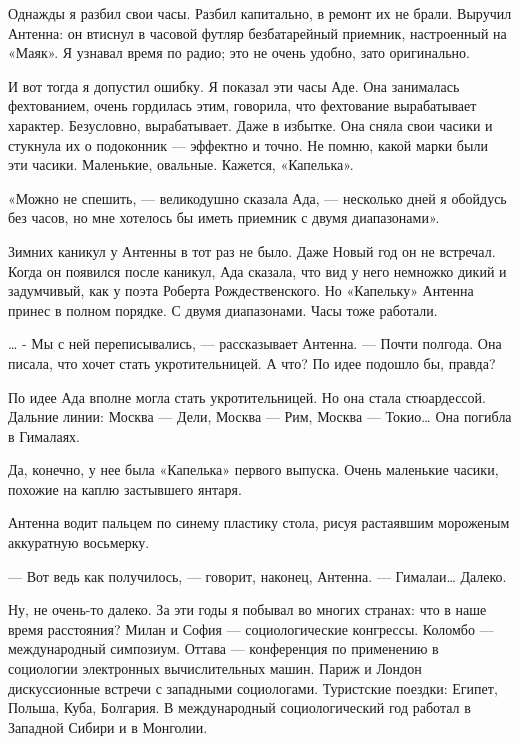    Однажды я  разбил свои  часы. Разбил  капитально, в  ремонт их  не  брали.
   Выручил Антенна:  он  втиснул  в часовой  футляр  безбатарейный  приемник,
   настроенный на «Маяк». Я узнавал время по радио; это не очень удобно, зато
   оригинально.

   И вот тогда  я допустил  ошибку. Я показал  эти часы  Аде. Она  занималась
   фехтованием, очень гордилась этим,  говорила, что фехтование  вырабатывает
   характер. Безусловно, вырабатывает. Даже в избытке. Она сняла свои  часики
   и стукнула их о подоконник — эффектно и точно. Не помню, какой марки  были
   эти часики. Маленькие, овальные. Кажется, «Капелька».

   «Можно не спешить, — великодушно сказала Ада, — несколько дней я  обойдусь
   без часов, но мне хотелось бы иметь приемник с двумя диапазонами».

   Зимних каникул у Антенны в тот раз не было. Даже Новый год он не встречал.
   Когда он появился  после каникул,  Ада сказала,  что вид  у него  немножко
   дикий и задумчивый,  как у  поэта Роберта  Рождественского. Но  «Капельку»
   Антенна принес в полном порядке. С двумя диапазонами. Часы тоже работали.

   … - Мы с ней переписывались, — рассказывает Антенна. — Почти полгода.  Она
   писала, что  хочет  стать укротительницей.  А  что? По  идее  подошло  бы,
   правда?

   По идее Ада вполне могла стать укротительницей. Но она стала  стюардессой.
   Дальние линии: Москва — Дели, Москва — Рим, Москва — Токио… Она погибла  в
   Гималаях.

   Да, конечно,  у  нее  была «Капелька»  первого  выпуска.  Очень  маленькие
   часики, похожие на каплю застывшего янтаря.

   Антенна водит пальцем по синему пластику стола, рисуя растаявшим мороженым
   аккуратную восьмерку.

   — Вот ведь как получилось, — говорит, наконец, Антенна. — Гималаи… Далеко.

   Ну, не очень-то далеко.  За эти годы  я побывал во  многих странах: что  в
   наше время расстояния? Милан и София — социологические конгрессы.  Коломбо
   — международный симпозиум. Оттава — конференция по применению в социологии
   электронных вычислительных машин. Париж  и Лондон дискуссионные встречи  с
   западными социологами. Туристские поездки: Египет, Польша, Куба, Болгария.
   В  международный  социологический  год  работал  в  Западной  Сибири  и  в
   Монголии.

